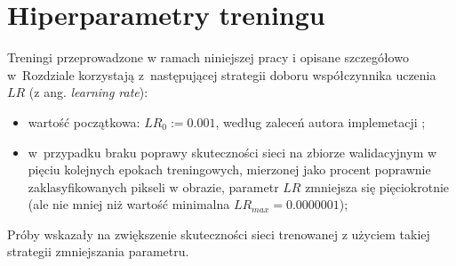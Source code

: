 \newpage
\section{Hiperparametry treningu}
\label{sec:hiperparametry}

Treningi przeprowadzone w ramach niniejszej pracy i opisane szczegółowo w~Rozdziale  korzystają z~następującej strategii doboru współczynnika uczenia $LR$ (z ang. \textit{learning rate}):
\begin{itemize}
  \item wartość początkowa: $LR_{0} := 0.001$, według zaleceń autora implemetacji \cite{matterport-mask-rcnn};
  \item w~przypadku braku poprawy skuteczności sieci na zbiorze walidacyjnym w pięciu kolejnych epokach treningowych, mierzonej jako procent poprawnie zaklasyfikowanych pikseli w obrazie, parametr $LR$ zmniejsza się pięciokrotnie (ale nie mniej niż wartość minimalna $ LR_{max} = 0.0000001 $);
\end{itemize}

Próby wskazały na zwiększenie skuteczności sieci trenowanej z użyciem takiej strategii zmniejszania parametru.
